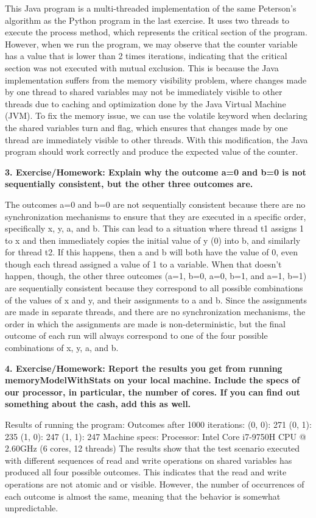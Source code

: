 \documentclass{article}
\theoremstyle{theorem}
\theoremstyle{definition}
\theoremstyle{remark}
\begin{document}
\medskip\noindent
This Java program is a multi-threaded implementation of the same Peterson's algorithm as the Python program in the last exercise. It uses two threads to execute the process method, which represents the critical section of the program.
However, when we run the program, we may observe that the counter variable has a value that is lower than 2 times iterations, indicating that the critical section was not executed with mutual exclusion. This is because the Java implementation suffers from the memory visibility problem, where changes made by one thread to shared variables may not be immediately visible to other threads due to caching and optimization done by the Java Virtual Machine (JVM).
To fix the memory issue, we can use the volatile keyword when declaring the shared variables turn and flag, which ensures that changes made by one thread are immediately visible to other threads. With this modification, the Java program should work correctly and produce the expected value of the counter.

\medskip\noindent
\textbf{3. Exercise/Homework: Explain why the outcome a=0 and b=0 is not sequentially consistent, but the other three outcomes are.}

\medskip\noindent
The outcomes a=0 and b=0 are not sequentially consistent because there are no synchronization mechanisms to ensure that they are executed in a specific order, specifically x, y, a, and b. This can lead to a situation where thread t1 assigns 1 to x and then immediately copies the initial value of y (0) into b, and similarly for thread t2. If this happens, then a and b will both have the value of 0, even though each thread assigned a value of 1 to a variable.
When that doesn't happen, though, the other three outcomes (a=1, b=0, a=0, b=1, and a=1, b=1) are sequentially consistent because they correspond to all possible combinations of the values of x and y, and their assignments to a and b. Since the assignments are made in separate threads, and there are no synchronization mechanisms, the order in which the assignments are made is non-deterministic, but the final outcome of each run will always correspond to one of the four possible combinations of x, y, a, and b.

\medskip\noindent
\textbf{4. Exercise/Homework: Report the results you get from running memoryModelWithStats on your local machine. Include the specs of our processor, in particular, the number of cores. If you can find out something about the cash, add this as well.}

\medskip\noindent
Results of running the program:
Outcomes after 1000 iterations:
(0, 0): 271
(0, 1): 235
(1, 0): 247
(1, 1): 247
Machine specs:
Processor: Intel Core i7-9750H CPU @ 2.60GHz (6 cores, 12 threads)
The results show that the test scenario executed with different sequences of read and write operations on shared variables has produced all four possible outcomes. This indicates that the read and write operations are not atomic and or visible. However, the number of occurrences of each outcome is almost the same, meaning that the behavior is somewhat unpredictable.
\end{document}
